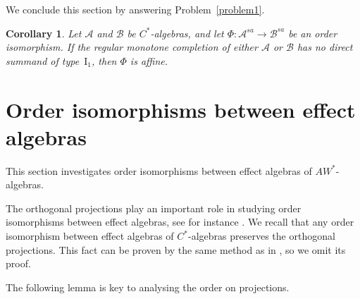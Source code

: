 \documentclass[12pt]{amsart}
\newtheorem{cor}[thm]{Corollary}
\theoremstyle{definition}
\theoremstyle{remark}
\numberwithin{equation}{section}
\begin{document}
We conclude this section by answering Problem~\ref{problem1}.
\begin{cor}
	Let $\mathcal{A}$ and $\mathcal{B}$ be $C^*$-algebras, and let $\Phi:\mathcal{A}^{sa}\to\mathcal{B}^{sa}$ be an order isomorphism. If the regular monotone completion of either $\mathcal{A}$ or $\mathcal{B}$ has no direct summand of type~$\mathrm{I}_1$, then $\Phi$ is affine.
\end{cor}





  


 
 
 
 
 
 
 
 
 
 
 
 
 
 
 
 
 
 
 








\section{Order isomorphisms between effect
algebras}\label{S3}


This section investigates order isomorphisms between effect algebras of $AW^*$-algebras. 

The orthogonal  projections play an important role in  studying order isomorphisms between  effect algebras, see for instance \cite{Our, mori, Semrl}. We recall    that any order isomorphism between effect  algebras of $C^*$-algebras  preserves the orthogonal projections. This fact can be proven by the same method as in \cite[Lemma 3.1]{mori}, so we omit its  proof.  

The following lemma  is   key to analysing the order on projections.
\end{document}
